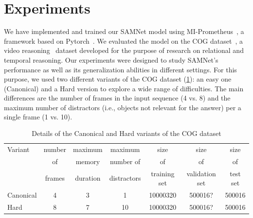 \section{Experiments}

We have implemented and trained our SAMNet model using MI-Prometheus~\cite{kornuta2018accelerating}, a framework based on Pytorch~\cite{paszke2017automatic}. 
We evaluated the model on the COG dataset~\cite{yang2018dataset}, a video reasoning~\cite{mogadala2019trends} dataset developed for the purpose of research on relational and temporal reasoning.
Our experiments were designed to study SAMNet's performance as well as its generalization abilities in different settings.
For this purpose, we used two different variants of the COG dataset (\cref{tab:cog_variants}): an easy one (Canonical) and a Hard version to explore a wide range of difficulties.
The main differences are the number of frames in the input sequence (4 vs. 8) and the maximum number of distractors (i.e., objects not relevant for the answer) per a single frame (1 vs. 10).


\begin{table}[htb]
\caption{Details of the Canonical and Hard variants of the COG dataset}
\centering
\begin{tabular}{lcccccc}
	\toprule
	Variant    &  	number &  	maximum & maximum & size & size & size  \\ 
	& of   & memory & number of & of & of & of  \\
	& frames & duration & distractors & training set & validation set & test set \\
	\midrule
	Canonical & 4 & 3 & 1 & 10000320 & 500016? & 500016 \\	
	Hard  & 8 & 7 & 10 & 10000320 & 500016?  & 500016 \\
	\bottomrule	
\end{tabular}
\label{tab:cog_variants}
\end{table}




%
%

